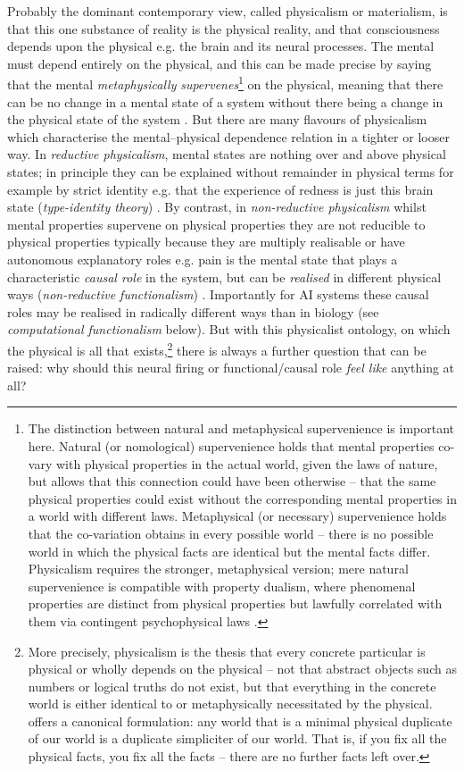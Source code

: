 \documentclass[11pt, a4paper, onecolumn, gdm]{google}
\begin{document}
Probably the dominant contemporary view, called physicalism or materialism, is that this one substance of reality is the physical reality, and that consciousness depends upon the physical e.g. the brain and its neural processes.
The mental must depend entirely on the physical, and this can be made precise by saying that the mental \emph{metaphysically} \emph{supervenes}\footnote{The distinction between natural and metaphysical supervenience is important here. Natural (or nomological) supervenience holds that mental properties co-vary with physical properties in the actual world, given the laws of nature, but allows that this connection could have been otherwise -- that the same physical properties could exist without the corresponding mental properties in a world with different laws. Metaphysical (or necessary) supervenience holds that the co-variation obtains in every possible world -- there is no possible world in which the physical facts are identical but the mental facts differ. Physicalism requires the stronger, metaphysical version; mere natural supervenience is compatible with property dualism, where phenomenal properties are distinct from physical properties but lawfully correlated with them via contingent psychophysical laws \citep{chalmers1996,kim1998}.} on the physical, meaning that there can be no change in a mental state of a system without there being a change in the physical state of the system \citep{kim1998}.
But there are many flavours of physicalism which characterise the mental--physical dependence relation in a tighter or looser way.
In \emph{reductive physicalism}, mental states are nothing over and above physical states; in principle they can be explained without remainder in physical terms for example by strict identity e.g. that the experience of redness is just this brain state (\emph{type-identity theory}) \citep{place1956}.
By contrast, in \emph{non-reductive physicalism} whilst mental properties supervene on physical properties they are not reducible to physical properties typically because they are multiply realisable or have autonomous explanatory roles e.g. pain is the mental state that plays a characteristic \emph{causal role} in the system, but can be \emph{realised} in different physical ways (\emph{non-reductive functionalism}) \citep{fodor1974}.
Importantly for AI systems these causal roles may be realised in radically different ways than in biology (see \emph{computational functionalism} below).
But with this physicalist ontology, on which the physical is all that exists,\footnote{More precisely, physicalism is the thesis that every concrete particular is physical or wholly depends on the physical -- not that abstract objects such as numbers or logical truths do not exist, but that everything in the concrete world is either identical to or metaphysically necessitated by the physical. \citet{jackson1998} offers a canonical formulation: any world that is a minimal physical duplicate of our world is a duplicate simpliciter of our world. That is, if you fix all the physical facts, you fix all the facts -- there are no further facts left over.} there is always a further question that can be raised: why should this neural firing or functional/causal role \emph{feel like} anything at all?
\end{document}
